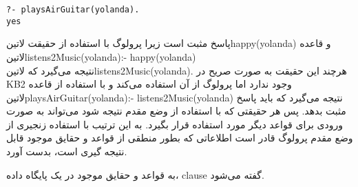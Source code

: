 \begin{latin}
\begin{lstlisting}
?- playsAirGuitar(yolanda).
yes
\end{lstlisting}
\end{latin}

پاسخ مثبت است زیرا پرولوگ با استفاده از حقیقت ‌لاتین{happy(yolanda)} و قاعده \\
 ‌لاتین{listens2Music(yolanda):-  happy(yolanda)} \\
نتیجه می‌گیرد که ‌لاتین{listens2Music(yolanda)}. هرچند این حقیقت به صورت صریح در KB2 وجود ندارد اما پرولوگ از آن استفاده می‌کند و با استفاده از قاعده ‌لاتین{playsAirGuitar(yolanda):-  listens2Music(yolanda)}  نتیجه می‌گیرد که باید پاسخ مثبت بدهد. پس هر حقیقتی که با استفاده از وضع مقدم نتیجه شود می‌تواند به صورت ورودی برای قواعد دیگر مورد استفاده قرار بگیرد. به این ترتیب با استفاده زنجیری از وضع مقدم پرولوگ قادر است اطلاعاتی که بطور منطقی از قواعد و حقایق موجود قابل نتیجه گیری است، بدست آورد.

به قواعد و حقایق موجود در یک پایگاه داده، clause گفته می‌شود.

